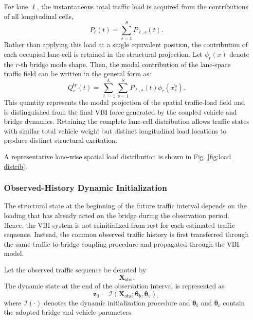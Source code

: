 \documentclass[journal]{IEEEtran}
\begin{document}
For lane $\ell$, the instantaneous total traffic load is acquired from the contributions of all longitudinal cells,
\begin{equation}
P_{\ell}(t) = \sum_{s=1}^{S}P_{\ell,s}(t).
\end{equation}
Rather than applying this load at a single equivalent position, the contribution of each occupied lane-cell is retained in the structural projection. Let $\phi_r(x)$ denote the $r$-th bridge mode shape. Then, the modal contribution of the lane-space traffic field can be written in the general form as:
\begin{equation}
Q_r^{\mathrm{tr}}(t) = \sum_{\ell=1}^{L}\sum_{s=1}^{S}P_{\ell,s}(t)\phi_r\left(x_s^{\mathrm{b}}\right).
\end{equation}
This quantity represents the modal projection of the spatial traffic-load field and is distinguished from the final VBI force generated by the coupled vehicle and bridge dynamics. Retaining the complete lane-cell distribution allows traffic states with similar total vehicle weight but distinct longitudinal load locations to produce distinct structural excitation.

A representative lane-wise spatial load distribution is shown in Fig. \ref{fig:load distrib}.

\subsubsection{Observed-History Dynamic Initialization}

The structural state at the beginning of the future traffic interval depends on the loading that has already acted on the bridge during the observation period. Hence, the VBI system is not reinitialized from rest for each estimated traffic sequence. Instead, the common observed traffic history is first transferred through the same traffic-to-bridge coupling procedure and propagated through the VBI model.

Let the observed traffic sequence be denoted by
\begin{equation}
\mathbf{X}_{\mathrm{obs}}.
\end{equation}
The dynamic state at the end of the observation interval is represented as
\begin{equation}
\mathbf{z}_{0} = \mathcal{I}\left(\mathbf{X}_{\mathrm{obs}};\boldsymbol{\theta}_{b},\boldsymbol{\theta}_{v}\right),
\end{equation}
where $\mathcal{I}(\cdot)$ denotes the dynamic initialization procedure and $\boldsymbol{\theta}_{b}$ and $\boldsymbol{\theta}_{v}$ contain the adopted bridge and vehicle parameters.
\end{document}
